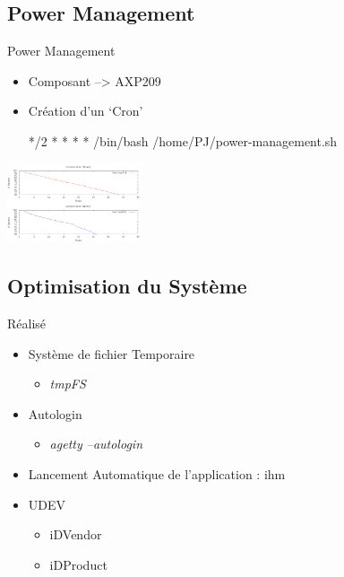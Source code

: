 \documentclass[11pt]{beamer}
\begin{document}
	\subsection{Power Management}
	\begin{frame}[fragile]{Power Management}
	\begin{itemize}
			\item Composant --> AXP209\\
			\item Création d'un `Cron'
				\begin{block}{}
				*/2 * * * * /bin/bash /home/PJ/power-management.sh\\
				\end{block}
	\end{itemize}
	\begin{center}
		\includegraphics[width=4cm]{common/power_management.png}
	\end{center}
	\end{frame}
	\subsection{Optimisation du Système}
	\begin{frame}{Réalisé}
	 \begin{itemize}
	 \item  Système de fichier Temporaire \\
	    	 \begin{itemize}
		    \item  \textit{tmpFS}
		  \end{itemize}
	\item Autologin \\
	  	  \begin{itemize}
		    \item  \textit{agetty --autologin}
		  \end{itemize}
	\item Lancement Automatique de l'application : ihm\\
	\item UDEV \\
	  \begin{itemize}
		    \item iDVendor
		    \item iDProduct
	  \end{itemize}
	\end{itemize}
	\end{frame}
	
\end{document}
